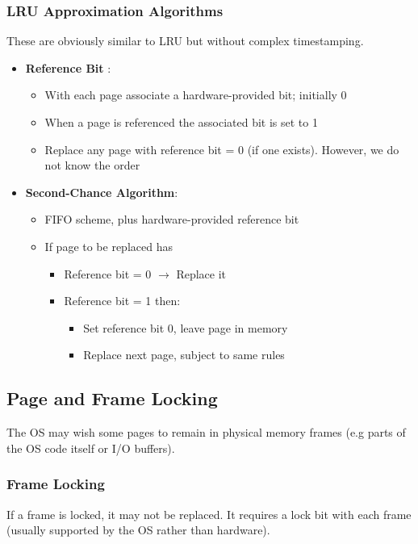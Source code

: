 \documentclass{article}%
\begin{document}
\subsubsection{LRU Approximation Algorithms}
\label{sec:org8743693}
These are obviously similar to LRU but without complex timestamping.
\begin{itemize}
\item \textbf{Reference Bit} :
\begin{itemize}
\item With each page associate a hardware-provided bit; initially 0
\item When a page is referenced the associated bit is set to 1
\item Replace any page with reference bit = 0 (if one exists). However, we do not know the order
\end{itemize}
\item \textbf{Second-Chance Algorithm}:
\begin{itemize}
\item FIFO scheme, plus hardware-provided reference bit
\item If page to be replaced has
\begin{itemize}
\item Reference bit = 0 \(\rightarrow\) Replace it
\item Reference bit = 1 then:
\begin{itemize}
\item Set reference bit 0, leave page in memory
\item Replace next page, subject to same rules
\end{itemize}
\end{itemize}
\end{itemize}
\end{itemize}

\subsection{Page and Frame Locking}
\label{sec:org93176bc}
The OS may wish some pages to remain in physical memory frames (e.g parts of the OS code itself or I/O buffers).
\subsubsection{Frame Locking}
\label{sec:org1a9f31b}
If a frame is locked, it may not be replaced.
It requires a lock bit with each frame (usually supported by the OS rather than hardware).
\end{document}
